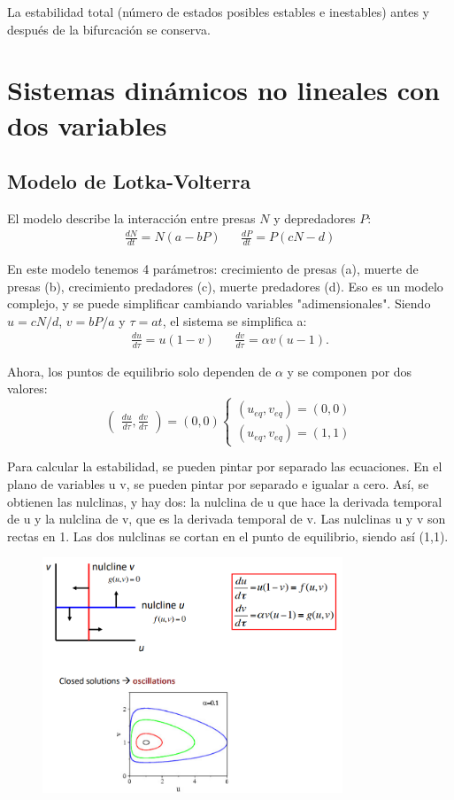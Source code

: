La estabilidad total (número de estados posibles estables e inestables) antes y después de la bifurcación se conserva. 

\section{Sistemas dinámicos no lineales con dos variables}
\subsection{Modelo de Lotka-Volterra}
El modelo describe la interacción entre presas $N$ y depredadores $P$:
\begin{align*}
\frac{dN}{dt} = N(a - bP) &&
\frac{dP}{dt} = P(cN - d)
\end{align*}

En este modelo tenemos 4 parámetros: crecimiento de presas (a), muerte de presas (b), crecimiento predadores (c), muerte predadores (d). Eso es un modelo complejo, y se puede simplificar cambiando variables "adimensionales". Siendo $u = cN/d$, $v = bP/a$ y $\tau = at$, el sistema se simplifica a:
\begin{align*}
\frac{du}{d\tau} = u(1 - v) &&
\frac{dv}{d\tau} = \alpha v(u - 1).
\end{align*}

Ahora, los puntos de equilibrio solo dependen de $\alpha$ y se componen por dos valores:
$$\begin{pmatrix}
\frac{du}{d\tau}, \frac{dv}{d\tau}
\end{pmatrix} = (0,0) \begin{cases}
(u_{eq}, v_{eq}) = (0,0) \\
(u_{eq}, v_{eq}) = (1,1) 
\end{cases}$$

Para calcular la estabilidad, se pueden pintar por separado las ecuaciones. En el plano de variables u v, se pueden pintar por separado e igualar a cero. Así, se obtienen las nulclinas, y hay dos: la nulclina de u que hace la derivada temporal de u y la nulclina de v, que es la derivada temporal de v. Las nulclinas u y v son rectas en 1. Las dos nulclinas se cortan en el punto de equilibrio, siendo así (1,1).

\begin{figure}[h]
\centering
\includegraphics[width = 0.8\textwidth]{figs/nulclinas.png}
\end{figure}

